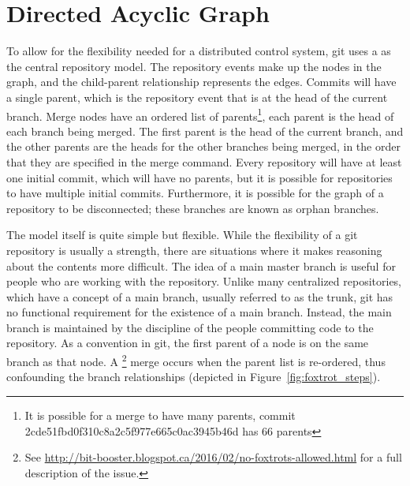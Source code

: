 \section{Directed Acyclic Graph}
\label{sec:directed_acyclic_graph}

To allow for the flexibility needed for a distributed control system,
git uses a  as the central
repository model. The repository events make up the nodes in the graph,
and the child-parent relationship represents the edges. Commits will
have a single parent, which is the repository event that is at the head
of the current branch. Merge nodes have an ordered list of
parents\footnote{It is possible for a merge to have many parents, commit
  2cde51fbd0f310c8a2c5f977e665c0ac3945b46d has 66 parents}, each parent
is the head of each branch being merged. The first parent is the head of
the current branch, and the other parents are the heads for the other
branches being merged, in the order that they are specified in the merge
command. Every repository will have at least one initial commit, which
will have no parents, but it is possible for repositories to have
multiple initial commits. Furthermore, it is possible for the graph of a
repository to be disconnected; these branches are known as orphan
branches.

The model itself is quite simple but flexible. While the flexibility of
a git repository is usually a strength, there are situations where it
makes reasoning about the contents more difficult. The idea of a main
master branch is useful for people who are working with the repository.
Unlike many centralized repositories, which have a concept of a main
branch, usually referred to as the trunk, git has no functional
requirement for the existence of a main branch. Instead, the main branch
is maintained by the discipline of the people committing code to the
repository. As a convention in git, the first parent of a node is on the
same branch as that node. A \foxtrot\footnote{See
  \url{http://bit-booster.blogspot.ca/2016/02/no-foxtrots-allowed.html}
  for a full description of the issue.} merge occurs when the parent
list is re-ordered, thus confounding the branch relationships
(depicted in Figure~\ref{fig:foxtrot_steps}).

